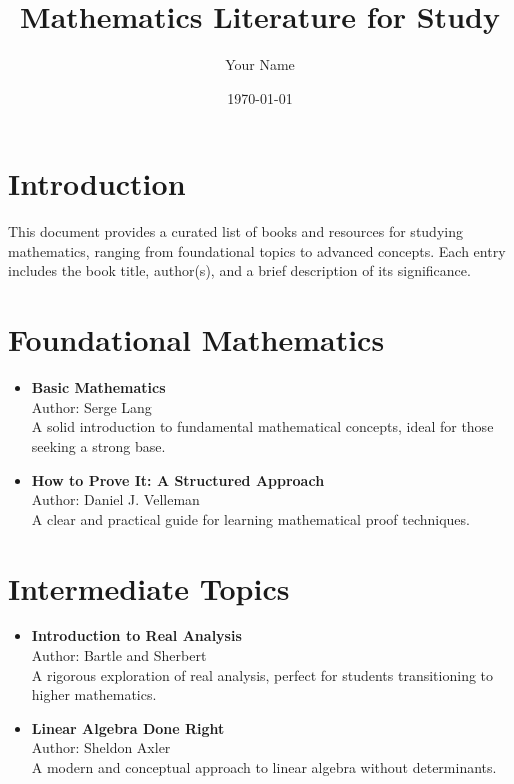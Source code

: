 \documentclass[a4paper,11pt]{article}
\title{Mathematics Literature for Study}
\author{Your Name}
\date{\today}
\begin{document}
\maketitle

\section*{Introduction}
This document provides a curated list of books and resources for studying mathematics, ranging from foundational topics to advanced concepts. Each entry includes the book title, author(s), and a brief description of its significance.

\section{Foundational Mathematics}
\begin{itemize}[left=0pt]
    \item \textbf{Basic Mathematics}\\
    Author: Serge Lang\\
    A solid introduction to fundamental mathematical concepts, ideal for those seeking a strong base.
    
    \item \textbf{How to Prove It: A Structured Approach}\\
    Author: Daniel J. Velleman\\
    A clear and practical guide for learning mathematical proof techniques.
\end{itemize}

\section{Intermediate Topics}
\begin{itemize}[left=0pt]
    \item \textbf{Introduction to Real Analysis}\\
    Author: Bartle and Sherbert\\
    A rigorous exploration of real analysis, perfect for students transitioning to higher mathematics.
    
    \item \textbf{Linear Algebra Done Right}\\
    Author: Sheldon Axler\\
    A modern and conceptual approach to linear algebra without determinants.
\end{itemize}
\end{document}
